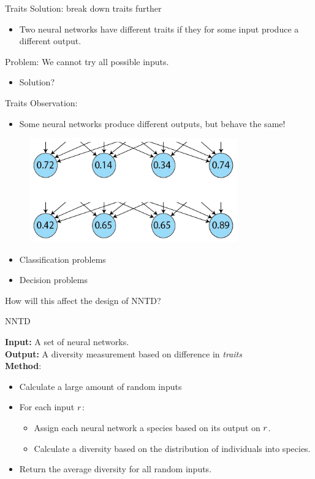 \begin{frame}{Traits}
  Solution: break down traits further
  \begin{itemize}
	\item Two neural networks have different traits if they for some input produce a different output.
  \end{itemize}
    \vspace{30pt}
  Problem: We cannot try all possible inputs.
  \begin{itemize}
    \item Solution?
  \end{itemize}
\end{frame}

\begin{frame}{Traits}
Observation:
\begin{itemize}
\item Some neural networks produce different outputs, but behave the same!
\end{itemize}
  \begin{figure}[p]
  \includegraphics[width=0.8\textwidth]{images/whyhighestvalue.png}
  \end{figure}
\begin{itemize}
	\item Classification problems
	\item Decision problems
\end{itemize}
How will this affect the design of NNTD?
\end{frame}

\begin{frame}{NNTD}
\begin{center}
  \textbf{Input:} A set of neural networks.\\
  \textbf{Output:} A diversity measurement based on difference in \emph{traits}\\
  \vspace{30pt}
  \textbf{Method}:
  \begin{itemize}
  \item Calculate a large amount of random inputs
  \item For each input $r$:
  \begin{itemize}
	  \item Assign each neural network a species based on its output on $r$.
	  \item Calculate a diversity based on the distribution of individuals into species.
  \end{itemize}
  \item Return the average diversity for all random inputs.
  \end{itemize}
\end{center}
\end{frame}

